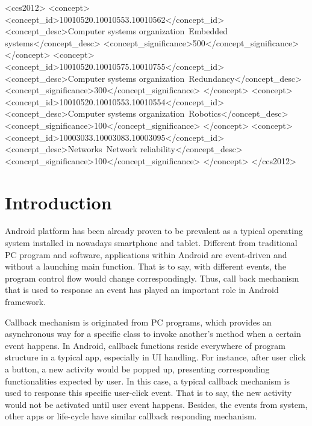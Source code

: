 \documentclass{sig-alternate-05-2015}
\begin{document}
%
%
\begin{CCSXML}
<ccs2012>
 <concept>
  <concept_id>10010520.10010553.10010562</concept_id>
  <concept_desc>Computer systems organization~Embedded systems</concept_desc>
  <concept_significance>500</concept_significance>
 </concept>
 <concept>
  <concept_id>10010520.10010575.10010755</concept_id>
  <concept_desc>Computer systems organization~Redundancy</concept_desc>
  <concept_significance>300</concept_significance>
 </concept>
 <concept>
  <concept_id>10010520.10010553.10010554</concept_id>
  <concept_desc>Computer systems organization~Robotics</concept_desc>
  <concept_significance>100</concept_significance>
 </concept>
 <concept>
  <concept_id>10003033.10003083.10003095</concept_id>
  <concept_desc>Networks~Network reliability</concept_desc>
  <concept_significance>100</concept_significance>
 </concept>
</ccs2012>  
\end{CCSXML}



%
%

%
%
\printccsdesc



\section{Introduction}
Android platform has been already proven to be prevalent as a typical operating system installed in nowadays smartphone and tablet. Different from traditional PC program and software, applications within Android are event-driven and without a launching main function. That is to say, with different events, the program control flow would change correspondingly. Thus, call back mechanism that is used to response an event has played an important role in Android framework. 

Callback mechanism is originated from PC programs, which provides an asynchronous way for a specific class to invoke another's method when a certain event happens. In Android, callback functions reside everywhere of program structure in a typical app, especially in UI handling. For instance, after user click a button, a new activity would be popped up, presenting corresponding functionalities expected by user. In this case, a typical callback mechanism is used to response this specific user-click event. That is to say, the new activity would not be activated until user event happens. Besides, the events from system, other apps or life-cycle have similar callback responding mechanism.
\end{document}
